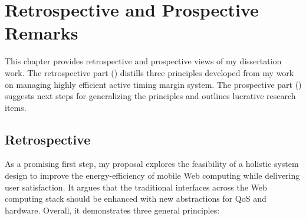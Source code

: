 
\chapter{Retrospective and Prospective Remarks}
\label{sec:conc}

This chapter provides retrospective and prospective views of my dissertation work. The retrospective part () distills three principles developed from my work on managing highly efficient active timing margin system. The prospective part () suggests next steps for generalizing the principles and outlines lucrative research items.

\section{Retrospective}
\label{sec:conc:retro}

As a promising first step, my proposal explores the feasibility of a holistic system design to improve the energy-efficiency of mobile Web computing while delivering user satisfaction. It argues that the traditional interfaces across the Web computing stack should be enhanced with new abstractions for QoS and hardware. Overall, it demonstrates three general principles:

